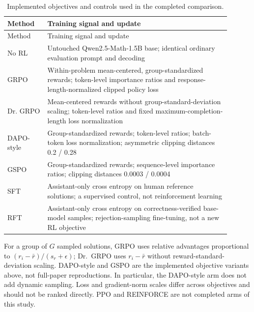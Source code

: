 \documentclass[10pt,letterpaper]{article}
\begin{document}
\begingroup\footnotesize\setlength{\tabcolsep}{3pt}
\begin{longtable}{>{\raggedright\arraybackslash}p{0.1620\linewidth}>{\raggedright\arraybackslash}p{0.7380\linewidth}}
\caption{Implemented objectives and controls used in the completed comparison.}\\
\toprule Method & Training signal and update \\
\midrule\endfirsthead
\toprule Method & Training signal and update \\
\midrule\endhead
\midrule\multicolumn{2}{r}{Continued on next page}\endfoot
\bottomrule\endlastfoot
No RL & Untouched Qwen2.5-Math-1.5B base; identical ordinary evaluation prompt and decoding \\
GRPO & Within-problem mean-centered, group-standardized rewards; token-level importance ratios and response-length-normalized clipped policy loss \\
Dr. GRPO & Mean-centered rewards without group-standard-deviation scaling; token-level ratios and fixed maximum-completion-length loss normalization \\
DAPO-style & Group-standardized rewards; token-level ratios; batch-token loss normalization; asymmetric clipping distances 0.2 /\allowbreak{} 0.28 \\
GSPO & Group-standardized rewards; sequence-level importance ratios; clipping distances 0.0003 /\allowbreak{} 0.0004 \\
SFT & Assistant-only cross entropy on human reference solutions; a supervised control, not reinforcement learning \\
RFT & Assistant-only cross entropy on correctness-verified base-model samples; rejection-sampling fine-tuning, not a new RL objective \\
\end{longtable}\endgroup


For a group of $G$ sampled solutions, GRPO uses relative advantages proportional to $(r_i-\bar r)/(s_r+\epsilon)$; Dr.~GRPO uses $r_i-\bar r$ without reward-standard-deviation scaling. DAPO-style and GSPO are the implemented objective variants above, not full-paper reproductions. In particular, the DAPO-style arm does not add dynamic sampling. Loss and gradient-norm scales differ across objectives and should not be ranked directly. PPO and REINFORCE are not completed arms of this study.
\end{document}
